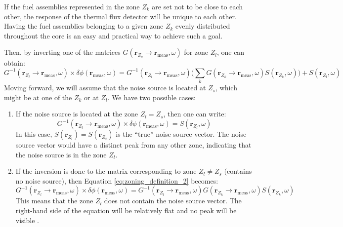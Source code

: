 If the fuel assemblies represented in the zone $Z_k$ are set not to be close to each other, the response of the thermal flux detector will be unique to each other. Having the fuel assemblies belonging to a given zone $Z_k$ evenly distributed throughout the core is an easy and practical way to achieve such a goal.

Then, by inverting one of the matrices $G(\textbf{r}_{Z_k} \rightarrow \textbf{r}_{\text{meas}}, \omega)$ for zone $Z_l$, one can obtain:
\begin{equation}
    G^{-1}(\textbf{r}_{Z_l} \rightarrow \textbf{r}_{\text{meas}}, \omega) \times \delta \phi (\textbf{r}_{\text{meas}},\omega) = G^{-1}(\textbf{r}_{Z_l} \rightarrow \textbf{r}_{\text{meas}}, \omega) \biggl(\sum_{k} G(\textbf{r}_{Z_k} \rightarrow \textbf{r}_{\text{meas}}, \omega) S(\textbf{r}_{Z_k}, \omega) \biggr) + S(\textbf{r}_{Z_l}, \omega)
    \label{eq:zoning_definition_2}
\end{equation}
Moving forward, we will assume that the noise source is located at $Z_s$, which might be at one of the $Z_k$ or at $Z_l$. We have two possible cases:
\begin{enumerate}
    \item If the noise source is located at the zone $ Z_l=Z_s$, then one can write:
    \begin{equation}
        G^{-1}(\textbf{r}_{Z_l} \rightarrow \textbf{r}_{\text{meas}}, \omega) \times \delta \phi (\textbf{r}_{\text{meas}},\omega) = S(\textbf{r}_{Z_l}, \omega)
        \label{eq:zoning_case1}
    \end{equation}
    In this case, $S(\textbf{r}_{Z_l}) = S(\textbf{r}_{Z_s})$ is the “true” noise source vector. The noise source vector would have a distinct peak from any other zone, indicating that the noise source is in the zone $Z_l$. 

    \item If the inversion is done to the matrix corresponding to zone $Z_l \neq Z_s$ (contains no noise source), then Equation \ref{eq:zoning_definition_2} becomes:
    \begin{equation}
        G^{-1}(\textbf{r}_{Z_l} \rightarrow \textbf{r}_{\text{meas}}, \omega) \times \delta \phi (\textbf{r}_{\text{meas}},\omega) = G^{-1}(\textbf{r}_{Z_l} \rightarrow \textbf{r}_{\text{meas}}, \omega) G(\textbf{r}_{Z_k} \rightarrow \textbf{r}_{\text{meas}}, \omega) S(\textbf{r}_{Z_k}, \omega)        
        \label{eq:zoning_case2}
    \end{equation}
    This means that the zone $Z_l$ does not contain the noise source vector. The right-hand side of the equation will be relatively flat and no peak will be visible \cite{demaziereIdentificationLocalizationAbsorbers2005}.
\end{enumerate}

